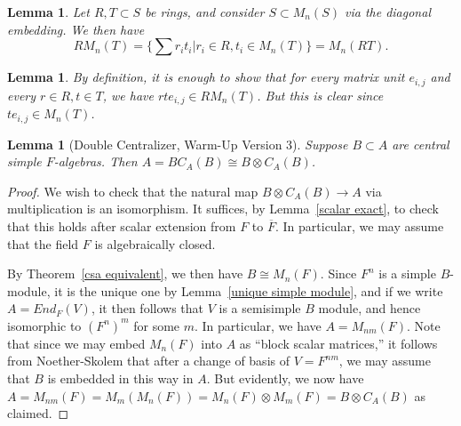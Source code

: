 \documentclass[12pt]{report}
\theoremstyle{plain}
\newtheorem{lem}[thm]{Lemma}
\newcommand{\ov}{\overline}
\begin{document}
\begin{lem}
Let $R, T \subset S$ be rings, and consider $S \subset M_n(S)$ via the
diagonal embedding. We then have
\[ R M_n(T) = \{\sum r_i t_i | r_i \in R, t_i \in M_n(T)\} = M_n(RT).\]
\end{lem}
\begin{lem}
By definition, it is enough to show that for every matrix unit $e_{i,j}$
and every $r \in R, t \in T$, we have $r t e_{i,j} \in R M_n(T)$. But this
is clear since $t e_{i,j} \in M_n(T)$.
\end{lem}

\begin{lem}[Double Centralizer, Warm-Up Version 3] \label{dc3} 
Suppose $B \subset A$ are central simple $F$-algebras. Then $A = B C_A(B)
\cong B \otimes C_A(B)$.
\end{lem}
\begin{proof}
We wish to check that the natural map $B \otimes C_A(B) \to A$ via
multiplication is an isomorphism. It suffices, by Lemma~\ref{scalar exact},
to check that this holds after scalar extension from $F$ to $\ov F$. In
particular, we may assume that the field $F$ is algebraically closed.

By Theorem~\ref{csa equivalent}, we then have $B \cong M_n(F)$. Since $F^n$
is a simple $B$-module, it is the unique one by Lemma~\ref{unique simple
module}, and if we write $A = End_F(V)$, it then follows that $V$ is a
semisimple $B$ module, and hence isomorphic to $(F^{n})^m$ for some $m$. In
particular, we have $A= M_{nm}(F)$. Note that since we may embed $M_n(F)$
into $A$ as ``block scalar matrices,'' it follows from Noether-Skolem that
after a change of basis of $V = F^{nm}$, we may assume that $B$ is embedded
in this way in $A$. But evidently, we now have $A = M_{nm}(F) = M_m(M_n(F))
= M_n(F) \otimes M_m(F) = B \otimes C_A(B)$ as claimed.
\end{proof}
\end{document}
